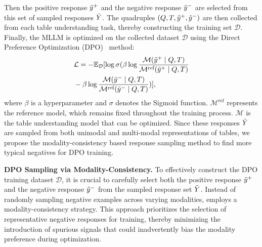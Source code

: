 Then the positive response $\Tilde{y}^+$ and the negative response $\Tilde{y}^-$ are selected from this set of sampled responses $\Tilde{Y}$. The quadruples $(Q, T, \Tilde{y}^+, \Tilde{y}^-)$ are then collected from each table understanding task, thereby constructing the training set $\mathcal{D}$. Finally, the MLLM is optimized on the collected dataset $\mathcal{D}$ using the Direct Preference Optimization (DPO)~\cite{rafailov2023direct} method:
\begin{equation}\label{eq:dpo}
\begin{aligned}
 & \mathcal{L} = -\mathbb{E}_{\mathcal{D}} [\log \sigma (\beta \log \frac{\mathcal{M}(\Tilde{y}^+ \mid Q, T)}{\mathcal{M}^\text{ref}(\Tilde{y}^+ \mid Q, T)}\\
 &- \beta \log \frac{\mathcal{M}(\Tilde{y}^- \mid Q, T)}{\mathcal{M}^\text{ref} (\Tilde{y}^- \mid Q, T)})],
\end{aligned}
\end{equation}
where $\beta$ is a hyperparameter and $\sigma$ denotes the Sigmoid function. $\mathcal{M}^{\text{ref}}$ represents the reference model, which remains fixed throughout the training process. $\mathcal{M}$ is the table understanding model that can be optimized.
Since these responses $\Tilde{Y}$ are sampled from both unimodal and multi-modal representations of tables, we propose the modality-consistency based response sampling method to find more typical negatives for DPO training.




\textbf{DPO Sampling via Modality-Consistency.} To effectively construct the DPO training dataset $\mathcal{D}$, it is crucial to carefully select both the positive response $\Tilde{y}^+$ and the negative response $\Tilde{y}^-$ from the sampled response set $\Tilde{Y}$. Instead of randomly sampling negative examples across varying modalities, \method{} employs a modality-consistency strategy. This approach prioritizes the selection of representative negative responses for training, thereby minimizing the introduction of spurious signals that could inadvertently bias the modality preference during optimization.

